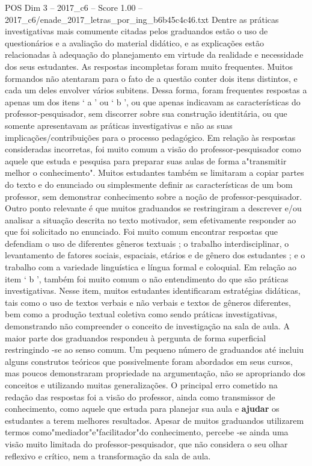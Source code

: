 \begin{textsample}{POS Dim 3 – 2017\_c6 – Score 1.00 – 2017\_c6/enade\_2017\_letras\_por\_ing\_b6b45c4c46.txt}
Dentre as práticas investigativas mais comumente citadas pelos graduandos estão o uso de questionários e a avaliação do material didático, e as explicações estão relacionadas à adequação do planejamento em virtude da realidade e necessidade dos seus estudantes.
As respostas incompletas foram muito frequentes.
Muitos formandos não atentaram para o fato de a questão conter dois itens distintos, e cada um deles envolver vários subitens.
Dessa forma, foram frequentes respostas a apenas um dos itens ‘ a ’ ou ‘ b ’, ou que apenas indicavam as características do professor-pesquisador, sem discorrer sobre sua construção identitária, ou que somente apresentavam as práticas investigativas e não as suas implicações/contribuições para o processo pedagógico.
Em relação às respostas consideradas incorretas, foi muito comum a visão do professor-pesquisador como aquele que estuda e pesquisa para preparar suas aulas de forma a"transmitir melhor o conhecimento".
Muitos estudantes também se limitaram a copiar partes do texto e do enunciado ou simplesmente definir as características de um bom professor, sem demonstrar conhecimento sobre a noção de professor-pesquisador.
Outro ponto relevante é que muitos graduandos se restringiram a descrever e/ou analisar a situação descrita no texto motivador, sem efetivamente responder ao que foi solicitado no enunciado.
Foi muito comum encontrar respostas que defendiam o uso de diferentes gêneros textuais ; o trabalho interdisciplinar, o levantamento de fatores sociais, espaciais, etários e de gênero dos estudantes ; e o trabalho com a variedade linguística e língua formal e coloquial.
Em relação ao item ‘ b ’, também foi muito comum o não entendimento do que são práticas investigativas.
Nesse item, muitos estudantes identificaram estratégias didáticas, tais como o uso de textos verbais e não verbais e textos de gêneros diferentes, bem como a produção textual coletiva como sendo práticas investigativas, demonstrando não compreender o conceito de investigação na sala de aula.
A maior parte dos graduandos respondeu à pergunta de forma superficial restringindo -se ao senso comum.
Um pequeno número de graduandos até incluiu alguns construtos teóricos que possivelmente foram abordados em seus cursos, mas poucos demonstraram propriedade na argumentação, não se apropriando dos conceitos e utilizando muitas generalizações.
O principal erro cometido na redação das respostas foi a visão do professor, ainda como transmissor de conhecimento, como aquele que estuda para planejar sua aula e \textbf{ajudar} os estudantes a terem melhores resultados.
Apesar de muitos graduandos utilizarem termos como"mediador"e"facilitador"do conhecimento, percebe -se ainda uma visão muito limitada do professor-pesquisador, que não considera o seu olhar reflexivo e crítico, nem a transformação da sala de aula.

\end{textsample}
